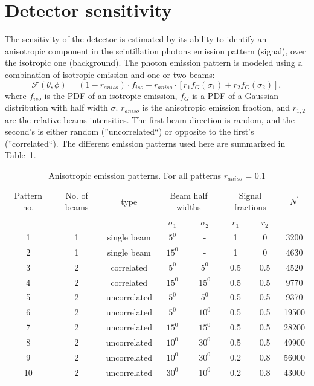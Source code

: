 \section{Detector sensitivity}
\label{sec:sim}
The sensitivity of the detector is estimated by its ability to identify an anisotropic component in the scintillation photons emission pattern (signal), over the isotropic one (background). The photon emission pattern is modeled using a combination of isotropic emission and one or two beams:
\begin{equation}
\mathcal{F}(\theta,\phi) = (1-r_{aniso}) \cdot f_{iso} + r_{aniso}\cdot\left[r_1 f_G(\sigma_1) + r_2 f_G(\sigma_2) \right], 
\end{equation}  
where  $f_{iso}$ is the PDF of an isotropic emission, $f_G$ is a PDF of a Gaussian distribution with half width $\sigma$. $r_{aniso}$ is the anisotropic emission fraction, and $r_{1,2}$ are the relative beams intensities. The first beam direction is random, and the second's is either random 
(''uncorrelated``) or opposite to the first's (''correlated``). The different emission patterns used here are summarized in Table~\ref{tab:AnisoPattern}.
 
\begin{table}[h]
  \centering
  \caption{Anisotropic emission patterns. For all patterns $r_{aniso}$ = 0.1}
  \label{tab:AnisoPattern}
  \begin{tabular}{|c |c |c|cc|cc|c|}
  \hline
  Pattern no. & No. of beams & type & \multicolumn{2}{c|}{Beam half widths}& \multicolumn{2}{c|}{Signal fractions} & $N^{'}$ \\
  &              &      &  $\sigma_1$ & $\sigma_2$   &  $r_1$ & $r_2$ &   \\
  \hline
  1 & 1 & single beam & $5^{0}$ & - & 1 & 0 & 3200\\
   2 & 1 & single beam & $15^{0}$ & - & 1 & 0 & 4630\\
   3 & 2 & correlated & $5^{0}$ & $5^{0}$ & 0.5 & 0.5 &  4520  \\
   4 & 2 & correlated & $15^{0}$ & $15^{0}$ & 0.5 & 0.5 & 9770  \\
   5 & 2 & uncorrelated & $5^{0}$ & $5^{0}$ & 0.5 & 0.5 & 9370\\
   6 & 2 & uncorrelated & $5^{0}$ & $10^{0}$ & 0.5 & 0.5 & 19500\\
   7 & 2 & uncorrelated & $15^{0}$ & $15^{0}$ & 0.5 & 0.5 & 28200\\
   8 & 2 & uncorrelated & $10^{0}$ & $30^{0}$ & 0.5 & 0.5 & 49900\\
   9 & 2 & uncorrelated & $10^{0}$ & $30^{0}$ & 0.2 & 0.8 & 56000\\
    10 & 2 & uncorrelated & $30^{0}$ & $10^{0}$ & 0.2 & 0.8 & 43000\\
  \hline
 \end{tabular}
\end{table} 
 
